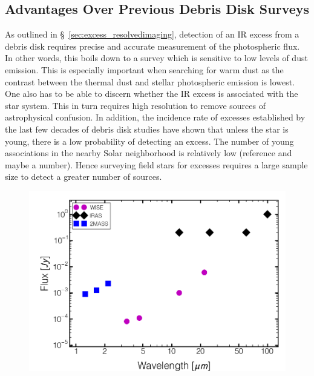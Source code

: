     
    
    
    
    
    
    

    \subsection{Advantages Over Previous Debris Disk Surveys}

    As outlined in \S~\ref{sec:excess_resolvedimaging}, detection of an IR excess from a debris disk requires precise and accurate measurement of the photospheric flux. In other words, this boils down to a survey which is sensitive to low levels of dust emission. This is especially important when searching for warm dust as the contrast between the thermal dust and stellar photospheric emission is lowest. One also has to be able to discern whether the IR excess is associated with the star system. This in turn requires high resolution to remove sources of astrophysical confusion. In addition, the incidence rate of excesses established by the last few decades of debris disk studies have shown that unless the star is young, there is a low probability of detecting an excess. The number of young associations in the nearby Solar neighborhood is relatively low (reference and maybe a number). Hence surveying field stars for excesses requires a large sample size to detect a greater number of sources. 
    \begin{figure}
    \centering
    \includegraphics[scale=0.5]{Ch2/flux_density_comparison}
    \caption[]{}
    \label{fig:flux_comparison}
    \end{figure}
    

